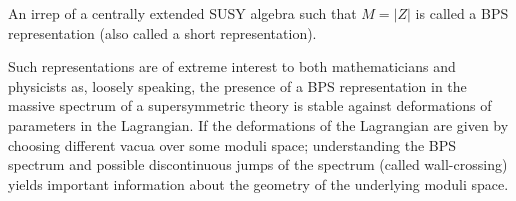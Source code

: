 \documentclass[12pt, onecolumn]{article}
\newenvironment{definition}[1][Definition]{\begin{trivlist}
\item[\hskip \labelsep {\bfseries #1}]}{\end{trivlist}}
\begin{document}
\begin{definition}
An irrep of a centrally extended SUSY algebra such that $M=|Z|$ is called a BPS representation (also called a short representation).
\end{definition}

\noindent Such representations are of extreme interest to both mathematicians and physicists as, loosely speaking, the presence of a BPS representation in the massive spectrum of a supersymmetric theory is stable against deformations of parameters in the Lagrangian.  If the deformations of the Lagrangian are given by choosing different vacua over some moduli space; understanding the BPS spectrum and possible discontinuous jumps of the spectrum (called wall-crossing) yields important information about the geometry of the underlying moduli space.
\end{document}
